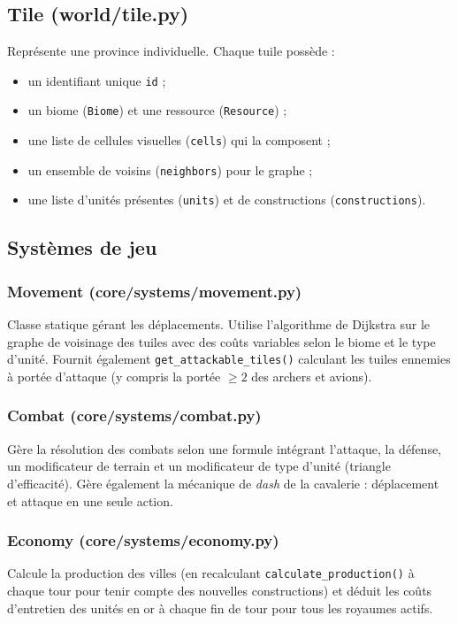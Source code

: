 \documentclass[12pt, a4paper]{article}
\begin{document}
\subsection{Tile (world/tile.py)}

Représente une province individuelle. Chaque tuile possède :
\begin{itemize}
    \item un identifiant unique \texttt{id} ;
    \item un biome (\texttt{Biome}) et une ressource (\texttt{Resource}) ;
    \item une liste de cellules visuelles (\texttt{cells}) qui la composent ;
    \item un ensemble de voisins (\texttt{neighbors}) pour le graphe ;
    \item une liste d'unités présentes (\texttt{units}) et de constructions (\texttt{constructions}).
\end{itemize}

\subsection{Systèmes de jeu}

\subsubsection{Movement (core/systems/movement.py)}
Classe statique gérant les déplacements. Utilise l'algorithme de Dijkstra sur le graphe de
voisinage des tuiles avec des coûts variables selon le biome et le type d'unité.
Fournit également \texttt{get\_attackable\_tiles()} calculant les tuiles ennemies à portée
d'attaque (y compris la portée $\geq 2$ des archers et avions).

\subsubsection{Combat (core/systems/combat.py)}
Gère la résolution des combats selon une formule intégrant l'attaque, la défense, un
modificateur de terrain et un modificateur de type d'unité (triangle d'efficacité).
Gère également la mécanique de \textit{dash} de la cavalerie : déplacement et attaque
en une seule action.

\subsubsection{Economy (core/systems/economy.py)}
Calcule la production des villes (en recalculant \texttt{calculate\_production()} à chaque
tour pour tenir compte des nouvelles constructions) et déduit les coûts d'entretien des
unités en or à chaque fin de tour pour tous les royaumes actifs.
\end{document}
